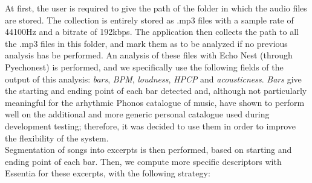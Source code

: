 At first, the user is required to give the path of the folder in which the audio files are stored. The collection is entirely stored as .mp3 files with a sample rate of 44100Hz and a bitrate of 192kbps. The application then collects the path to all the .mp3 files in this folder, and mark them as to be analyzed if no previous analysis has be performed. An analysis of these files with Echo Nest (through Pyechonest) is performed, and we specifically use the following fields of the output of this analysis: \textit{bars}, \textit{BPM}, \textit{loudness}, \textit{HPCP} and \textit{acousticness}. \textit{Bars} give the starting and ending point of each bar detected and, although not particularly meaningful for the arhythmic Phonos catalogue of music, have shown to perform well on the additional and more generic personal catalogue used during development testing; therefore, it was decided to use them in order to improve the flexibility of the system. \\ Segmentation of songs into excerpts is then performed, based on starting and ending point of each bar. Then, we compute more specific descriptors with Essentia for these excerpts, with the following strategy:
